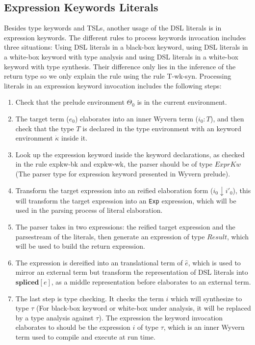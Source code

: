 \documentclass{sig-alternate}
\begin{document}
\subsection{Expression Keywords Literals}
Besides type keywords and TSLs, another usage of the DSL literals is in expression keywords. The different rules to process keywords invocation includes three situations: Using DSL literals in a black-box keyword, using DSL literals in a white-box keyword with type analysis and using DSL literals in a white-box keyword with type synthesis. Their difference only lies in the inference of the return type so we only explain the rule using the rule T-wk-syn. Processing literals in an expression keyword invocation includes the following steps:
\begin{enumerate}\setlength{\itemsep}{0pt}
\item Check that the prelude environment $\Theta_0$ is in the current environment. 
\item The target term ($e_0$) elaborates into an inner Wyvern term ($i_0:T$), and then check that the type $T$ is declared in the type environment with an keyword environment $\dot\kappa$ inside it.
\item Look up the expression keyword inside the keyword declarations, as checked in the rule expkw-bk and expkw-wk, the parser should be of type $ExprKw$ (The parser type for expression keyword presented in Wyvern prelude).
\item Transform the target expression into an reified elaboration form ($i_0\downarrow i'_0$), this will transform the target expression into an \verb|Exp| expression, which will be used in the parsing process of literal elaboration.
\item The parser takes in two expressions: the reified target expression and the parsestream of the literals, then generate an expression of type $Result$, which will be used to build the return expression.
\item The expression is dereified into an translational term of $\hat{e}$, which is used to mirror an external term but transform the representation of DSL literals into $\mathbf{spliced}[e]$, as a middle representation before elaborates to an external term.
\item The last step is type checking. It checks the term $i$ which will synthesize to type $\tau$ (For black-box keyword or white-box under analysis, it will be replaced by a type analysis against $\tau$). The expression the keyword invocation elaborates to should be the expression $i$ of type $\tau$, which is an inner Wyvern term used to compile and execute at run time. 
\end{enumerate}

\end{document}

